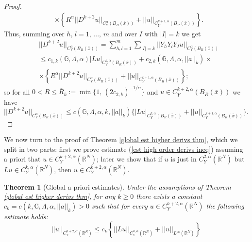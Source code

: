 \documentclass{article}
\newtheorem{theorem}{Theorem}[section]
\numberwithin{equation}{section}
\begin{document}
\begin{proof}
\begin{align*}
        & \times \left\{ R^{\alpha}  ||D^{k+2} u||_{C^{\alpha}_Y(B_R(\overline{x}))}+ ||u||_{C^{k+1,\alpha}_Y(B_R(\overline{x}))} \right\}.
    \end{align*}
    Thus, summing over $h, \, l = 1, \, ..., \, m$ and over $I$ with $|I|=k$ we get
    \begin{align*}
        & ||D^{k+2} u||_{C^{\alpha}_Y(B_R(\overline{x}))} = \sum_{h,l=1}^m \sum_{|I|=k} ||Y_h Y_l Y_I u||_{C^{\alpha}_Y(B_R(\overline{x}))} \\
        & \leq c_{1,k}(\mathbb{G}, \Lambda, \alpha) |Lu|_{C^{k,\alpha}_Y(B_R(\overline{x}))} + c_{2,k}(\mathbb{G}, \Lambda, \alpha, ||a||_k) \times 
        \\
        & \times \left\{ R^{\alpha} ||D^{k+2} u||_{C^{\alpha}_Y(B_R(\overline{x}))} + ||u||_{C^{k+1,\alpha}_Y(B_R(\overline{x}))} \right\};
    \end{align*}
    so for all $0 < R \leq \overline{R}_k := \min\{1, \, (2c_{2,k})^{-1/\alpha}\}$ and $u \in C^{k+2,\alpha}_Y(B_R(\overline{x}))$ we have
    \begin{equation*}
        ||D^{k+2} u||_{C^{\alpha}_Y(B_R(\overline{x}))} \leq c(\mathbb{G}, \Lambda, \alpha, k, ||a||_k) \{ |Lu|_{C^{k,\alpha}_Y(B_R(\overline{x}))} + ||u||_{C^{k+1,\alpha}_Y(B_R(\overline{x}))} \}.
    \end{equation*}
\end{proof}

\vspace{2mm}

We now turn to the proof of Theorem \ref{global est higher derivs thm}, which we split in two parts: first we prove estimate (\ref{est high order derivs ineq}) assuming a priori that $u \in C^{k+2,\alpha}_Y(\mathbb{R}^N)$; later we show that if $u$ is just in $C^{2,\alpha}_Y(\mathbb{R}^N)$ but $Lu \in C^{k,\alpha}_Y(\mathbb{R}^N)$, then $u \in C^{k+2,\alpha}_Y(\mathbb{R}^N)$.

\vspace{2mm}

\begin{theorem}[Global a priori estimates]
\label{first part thm 1.6: estimates}
    Under the assumptions of Theorem \ref{global est higher derivs thm}, for any $k \geq 0$ there exists a constant $c_k=c(k,\mathbb{G}, \Lambda, \alpha, ||a||_k)>0$ such that for every $u \in C^{k+2,\alpha}_Y(\mathbb{R}^N)$ the following estimate holds:
    \begin{equation}
        \label{est higher derivs ineq} ||u||_{C^{k+2,\alpha}_Y(\mathbb{R}^N)} \leq c_k \left\{ ||Lu||_{C^{k,\alpha}_Y(\mathbb{R}^N)} + ||u||_{L^{\infty}(\mathbb{R}^N)} \right\}
    \end{equation}
\end{theorem}
\end{document}
